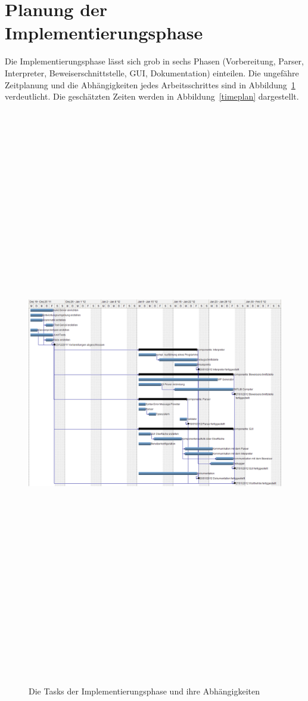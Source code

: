 \section{Planung der Implementierungsphase}

Die Implementierungsphase lässt sich grob in sechs Phasen (Vorbereitung, Parser, Interpreter, Beweiserschnittstelle, GUI, Dokumentation) einteilen. Die ungefähre Zeitplanung und die Abhängigkeiten jedes Arbeitsschrittes sind in Abbildung~\ref{gantt_impl} verdeutlicht. Die geschätzten Zeiten werden in Abbildung~\ref{timeplan} dargestellt.

\begin{figure}
	\centering
	\hspace*{-2cm}\vspace*{-2cm}\caption[B]{Die Tasks der Implementierungsphase und ihre Abhängigkeiten}
	\hspace*{-3cm}\vspace*{-3cm}\includegraphics[angle=90,width=19cm,height= 25cm]{diagrams/gantt_implementierung_diag.png}
	\label{gantt_impl}
\end{figure}

